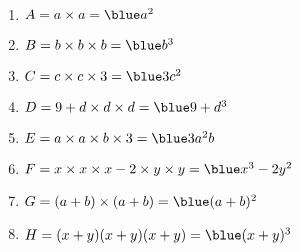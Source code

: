    \ \\ [-5mm]
   \begin{enumerate}
      \item $A =a\times a =\blue a^2$
      \item $B =b\times b\times b =\blue b^3$
      \item $C =c\times c\times3 =\blue3c^2$
      \item $D =9+d\times d\times d =\blue9+d^3$
      \item $E =a\times a\times b\times3 =\blue3a^2b$
      \item $F =x\times x\times x-2\times y\times y =\blue x^3-2y^2$
      \item $G =(a+b)\times(a+b) =\blue(a+b)^2$
      \item $H =(x+y)(x+y)(x+y) =\blue(x+y)^3$ \medskip
   \end{enumerate}
